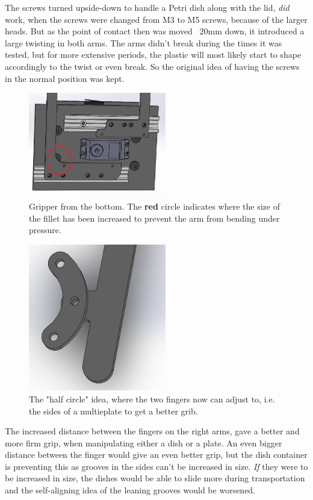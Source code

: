 \documentclass[10pt,a4paper]{article}
\begin{document}
		
		The screws turned upside-down to handle a Petri dish along with the lid, \textit{did} work, when the screws were changed from M3 to M5 screws, because of the larger heads. But as the point of contact then was moved ~20mm down, it introduced a large twisting in both arms. The arms didn't break during the times it was tested, but for more extensive periods, the plastic will most likely start to shape accordingly to the twist or even break. So the original idea of having the screws in the normal position was kept.
		\begin{figure}
			\includegraphics[width=6cm]{images/gripperLargerFillet.png}
			\caption{Gripper from the bottom. The {\color{red}\textbf{red}} circle indicates where the size of the fillet has been increased to prevent the arm from bending under pressure.}
			\label{fig:gripperLargerFillet}
		\end{figure}
		\begin{figure}
							\includegraphics[width=6cm]{images/halfCircle.png}
							\caption{The "half circle" idea, where the two fingers now can adjust to, i.e. the sides of a multieplate to get a better grib.}
							\label{fig:halfCircle}
						\end{figure}
		The increased distance between the fingers on the right arms, gave a better and more firm grip, when manipulating either a dish or a plate. An even bigger distance between the finger would give an even better grip, but the dish container is preventing this as grooves in the sides can't be increased in size. \textit{If} they were to be increased in size, the dishes would be able to slide more during transportation and the self-aligning idea of the leaning grooves would be worsened.
		
\end{document}
